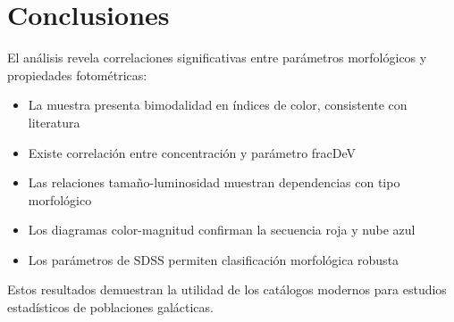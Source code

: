 \documentclass[twocolumn]{article}
\begin{document}
\section{Conclusiones}

El análisis revela correlaciones significativas entre parámetros morfológicos y propiedades fotométricas:

\begin{itemize}
    \item La muestra presenta bimodalidad en índices de color, consistente con literatura
    \item Existe correlación entre concentración y parámetro fracDeV
    \item Las relaciones tamaño-luminosidad muestran dependencias con tipo morfológico
    \item Los diagramas color-magnitud confirman la secuencia roja y nube azul
    \item Los parámetros de SDSS permiten clasificación morfológica robusta
\end{itemize}

Estos resultados demuestran la utilidad de los catálogos modernos para estudios estadísticos de poblaciones galácticas.





\end{document}

